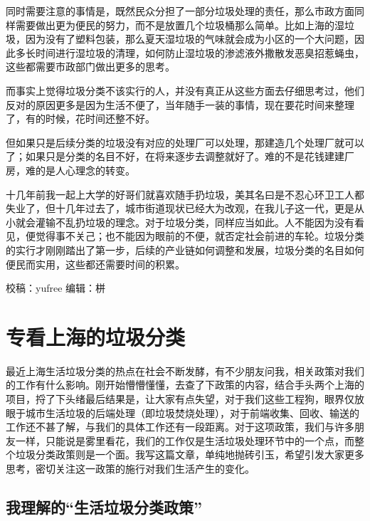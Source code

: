 \documentclass[]{book}
\begin{document}
同时需要注意的事情是，既然民众分担了一部分垃圾处理的责任，那么市政方面同样需要做出更为便民的努力，而不是放置几个垃圾桶那么简单。比如上海的湿垃圾，因为没有了塑料包装，那么夏天湿垃圾的气味就会成为小区的一个大问题，因此多长时间进行湿垃圾的清理，如何防止湿垃圾的渗滤液外撒散发恶臭招惹蝇虫，这些都需要市政部门做出更多的思考。

而事实上觉得垃圾分类不该实行的人，并没有真正从这些方面去仔细思考过，他们反对的原因更多是因为生活不便了，当年随手一装的事情，现在要花时间来整理了，有的时候，花时间还整不好。

但如果只是后续分类的垃圾没有对应的处理厂可以处理，那建造几个处理厂就可以了；如果只是分类的名目不好，在将来逐步去调整就好了。难的不是花钱建建厂房，难的是人心理念的转变。

十几年前我一起上大学的好哥们就喜欢随手扔垃圾，美其名曰是不忍心环卫工人都失业了，但十几年过去了，城市街道现状已经大为改观，在我儿子这一代，更是从小就会灌输不乱扔垃圾的理念。对于垃圾分类，同样应当如此。人不能因为没有看见，便觉得事不关己；也不能因为眼前的不便，就否定社会前进的车轮。垃圾分类的实行才刚刚踏出了第一步，后续的产业链如何调整和发展，垃圾分类的名目如何便民而实用，这些都还需要时间的积累。

校稿：yufree
编辑：栟

\hypertarget{ux4e13ux770bux4e0aux6d77ux7684ux5783ux573eux5206ux7c7b}{%
\section{专看上海的垃圾分类}\label{ux4e13ux770bux4e0aux6d77ux7684ux5783ux573eux5206ux7c7b}}

最近上海生活垃圾分类的热点在社会不断发酵，有不少朋友问我，相关政策对我们的工作有什么影响。刚开始懵懵懂懂，去查了下政策的内容，结合手头两个上海的项目，捋了下头绪最后结果是，让大家有点失望，对于我们这些工程狗，眼界仅放眼于城市生活垃圾的后端处理（即垃圾焚烧处理），对于前端收集、回收、输送的工作还不甚了解，与我们的具体工作还有一段距离。对于这项政策，我们与许多朋友一样，只能说是雾里看花，我们的工作仅是生活垃圾处理环节中的一个点，而整个垃圾分类政策则是一个面。我写这篇文章，单纯地抛砖引玉，希望引发大家更多思考，密切关注这一政策的施行对我们生活产生的变化。

\hypertarget{ux6211ux7406ux89e3ux7684ux751fux6d3bux5783ux573eux5206ux7c7bux653fux7b56}{%
\subsection{我理解的``生活垃圾分类政策''}\label{ux6211ux7406ux89e3ux7684ux751fux6d3bux5783ux573eux5206ux7c7bux653fux7b56}}
\end{document}

